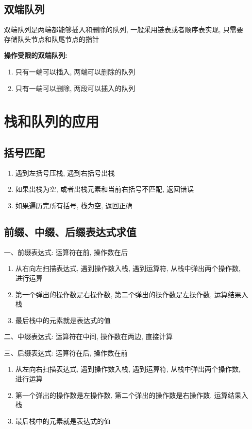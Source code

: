 \subsection{双端队列}
\begin{definition}[双端队列]
    双端队列是两端都能够插入和删除的队列, 一般采用链表或者顺序表实现, 只需要存储队头节点和队尾节点的指针

    \textbf{操作受限的双端队列:}
    \begin{enumerate}
        \item 只有一端可以插入, 两端可以删除的队列
        \item 只有一端可以删除, 两段可以插入的队列
    \end{enumerate}
\end{definition}
\section{栈和队列的应用}
\subsection{括号匹配}
\begin{theorem}[算法步骤]
    \begin{enumerate}
        \item 遇到左括号压栈, 遇到右括号出栈
        \item 如果出栈为空, 或者出栈元素和当前右括号不匹配, 返回错误
        \item 如果遍历完所有括号, 栈为空, 返回正确
    \end{enumerate}
\end{theorem}
\subsection{前缀、中缀、后缀表达式求值}
\begin{theorem}[表达式求值]
    一、前缀表达式: 运算符在前, 操作数在后
    \begin{enumerate}
        \item 从右向左扫描表达式, 遇到操作数入栈, 遇到运算符, 从栈中弹出两个操作数, 进行运算
        \item 第一个弹出的操作数是右操作数, 第二个弹出的操作数是左操作数, 运算结果入栈
        \item 最后栈中的元素就是表达式的值
    \end{enumerate}

    二、中缀表达式: 运算符在中间, 操作数在两边, 直接计算

    三、后缀表达式: 运算符在后, 操作数在前
    \begin{enumerate}
        \item 从左向右扫描表达式, 遇到操作数入栈, 遇到运算符, 从栈中弹出两个操作数, 进行运算
        \item 第一个弹出的操作数是左操作数, 第二个弹出的操作数是右操作数, 运算结果入栈
        \item 最后栈中的元素就是表达式的值
    \end{enumerate}
\end{theorem}

